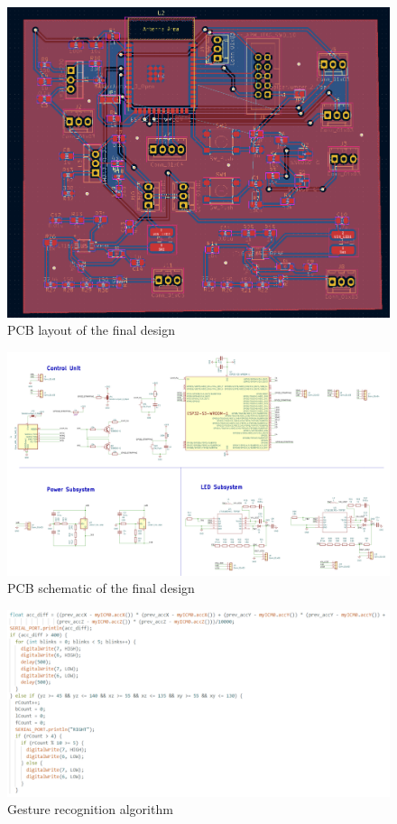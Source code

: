     \begin{figure}[ht]
        \centering
        \includegraphics[width=1.0\textwidth]{images/Final_PCB.png}
        \caption{PCB layout of the final design}
        \label{fig:pcb_layout}
    \end{figure}
    
    \begin{figure}[ht]
        \centering
        \includegraphics[width=1.0\textwidth]{images/pcb_schematic.png}
        \caption{PCB schematic of the final design}
        \label{fig:pcb_schematic}
    \end{figure}
    
    \begin{figure}[ht]
        \centering
        \includegraphics[width=1.0\textwidth]{images/gesture_alg.png}
        \caption{Gesture recognition algorithm}
        \label{fig:gesture_alg}
    \end{figure}
    
